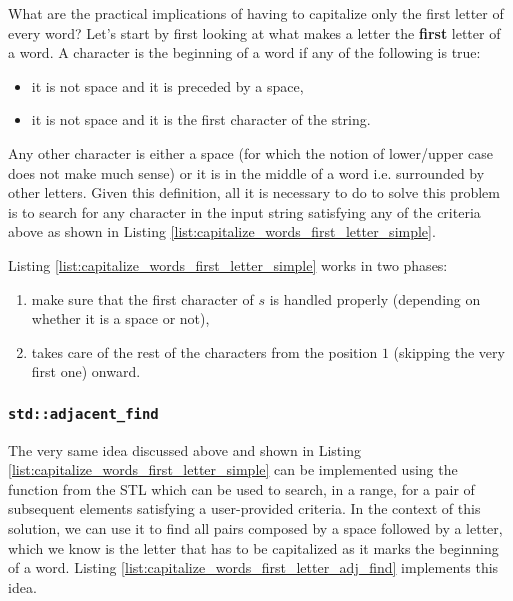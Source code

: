 What are the practical implications of having to capitalize only the first letter of every word? Let's start by first looking at what makes a letter the \textbf{first} letter of a word. 
A character is the beginning of a word if any of the following is true:
\begin{itemize}
	\item it is not space and it is preceded by a space,
	\item it is not space and it is the first character of the string.
\end{itemize}
Any other character is either a space (for which the notion of lower/upper case does not make much sense) or it is in the middle of a word i.e. surrounded by other letters. Given this definition, all it is necessary to do to solve this problem is to search for any character in the input string satisfying any of the criteria above as shown in Listing \ref{list:capitalize_words_first_letter_simple}.



Listing \ref{list:capitalize_words_first_letter_simple} works in two phases:
\begin{enumerate}
	\item make sure that the first character of $s$ is handled properly (depending on whether it is a space or not),
	\item takes care of the rest of the characters from the position $1$ (skipping the very first one) onward.
\end{enumerate}

\subsubsection{\texttt{std::adjacent\_find}}
The very same idea discussed above and shown in Listing \ref{list:capitalize_words_first_letter_simple} can be implemented using the function \cite{cit::std::adjancefind} from the STL which can be used to search, in a range, for a pair of subsequent elements satisfying  a user-provided criteria. In the context of this solution, we can use it to find all pairs composed by a space followed by a letter, which we know is the letter that has to be capitalized as it marks the beginning of a word.
Listing \ref{list:capitalize_words_first_letter_adj_find} implements this idea. 

